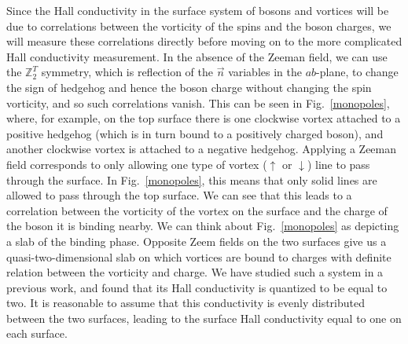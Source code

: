 \documentclass[prb,twocolumn]{revtex4-1}
\def\ztwot{\mathbb{Z}_2^T}
\begin{document}
Since the Hall conductivity in the surface system of bosons and vortices will be due to correlations between the vorticity of the spins and the boson charges,\cite{FQHE} we will measure these correlations directly before moving on to the more complicated Hall conductivity measurement. 
In the absence of the Zeeman field, we can use the $\ztwot$ symmetry, which is reflection of the $\vec n$ variables in the $ab$-plane, to change the sign of hedgehog and hence the boson charge without changing the spin vorticity, and so such correlations vanish. This can be seen in Fig.~\ref{monopoles}, where, for example, on the top surface there is one clockwise vortex attached to a positive hedgehog (which is in turn bound to a positively charged boson), and another clockwise vortex is attached to a negative hedgehog. Applying a Zeeman field corresponds to only allowing one type of vortex ($\uparrow$ or $\downarrow$) line to pass through the surface. In Fig.~\ref{monopoles}, this means that only solid lines are allowed to pass through the top surface. We can see that this leads to a correlation between the vorticity of the vortex on the surface and the charge of the boson it is binding nearby. We can think about Fig.~\ref{monopoles} as depicting a slab of the binding phase. Opposite Zeem fields on the two surfaces give us a quasi-two-dimensional slab on which vortices are bound to charges with definite relation between the vorticity and charge. We have studied such a system in a previous work,\cite{FQHE} and found that its Hall conductivity is quantized to be equal to two. It is reasonable to assume that this conductivity is evenly distributed between the two surfaces, leading to the surface Hall conductivity equal to one on each surface. 
\end{document}
